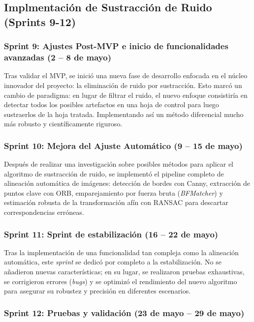 \subsection{\textbf{Implmentación de Sustracción de Ruido (Sprints 9-12)}}

\subsubsection{Sprint 9: Ajustes Post-MVP e inicio de funcionalidades avanzadas (2 – 8 de mayo)}

Tras validar el MVP, se inició una nueva fase de desarrollo enfocada en el núcleo innovador del proyecto: la eliminación de ruido por sustracción. Esto marcó un cambio de paradigma: en lugar de filtrar el ruido, el nuevo enfoque consistiría en detectar todos los posibles artefactos en una hoja de control para luego sustraerlos de la hoja tratada. Implementando así un método diferencial mucho más robusto y científicamente riguroso.

\subsubsection{Sprint 10: Mejora del Ajuste Automático (9 – 15 de mayo)}

Después de realizar una investigación sobre posibles métodos para aplicar el algoritmo de sustracción de ruido, se implementó el pipeline completo de alineación automática de imágenes: detección de bordes con Canny, extracción de puntos clave con ORB, emparejamiento por fuerza bruta (\textit{BFMatcher}) y estimación robusta de la transformación afín con RANSAC para descartar correspondencias erróneas.

\subsubsection{Sprint 11: Sprint de estabilización (16 – 22 de mayo)}

Tras la implementación de una funcionalidad tan compleja como la alineación automática, este \textit{sprint} se dedicó por completo a la estabilización. No se añadieron nuevas características; en su lugar, se realizaron pruebas exhaustivas, se corrigieron errores (\textit{bugs}) y se optimizó el rendimiento del nuevo algoritmo para asegurar su robustez y precisión en diferentes escenarios.

\subsubsection{Sprint 12:  Pruebas y validación (23 de mayo – 29 de mayo)}

